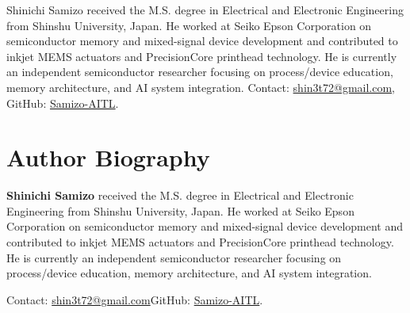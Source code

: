\documentclass[conference]{IEEEtran}
\begin{document}
\begin{IEEEbiography}{Shinichi Samizo}
received the M.S. degree in Electrical and Electronic Engineering from Shinshu University, Japan.
He worked at Seiko Epson Corporation on semiconductor memory and mixed-signal device development and contributed to inkjet MEMS actuators and PrecisionCore printhead technology.
He is currently an independent semiconductor researcher focusing on process/device education, memory architecture, and AI system integration.
Contact: \href{mailto:shin3t72@gmail.com}{shin3t72@gmail.com}, GitHub: \href{https://github.com/Samizo-AITL}{Samizo-AITL}.
\end{IEEEbiography}

\section*{Author Biography}
\textbf{Shinichi Samizo} received the M.S. degree in Electrical and Electronic Engineering from Shinshu University, Japan. 
He worked at Seiko Epson Corporation on semiconductor memory and mixed-signal device development and contributed to inkjet MEMS actuators and PrecisionCore printhead technology.
He is currently an independent semiconductor researcher focusing on process/device education, memory architecture, and AI system integration.
\par\smallskip Contact: \href{mailto:shin3t72@gmail.com}{shin3t72@gmail.com}\quad GitHub: \href{https://github.com/Samizo-AITL}{Samizo-AITL}.
\end{document}
